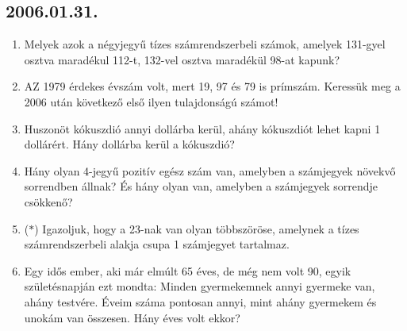 \subsection*{2006.01.31.}
\begin{enumerate}
\item Melyek azok a négyjegyű tízes számrendszerbeli számok, amelyek 131-gyel osztva maradékul 112-t, 132-vel osztva maradékül 98-at kapunk?

\item AZ 1979 érdekes évszám volt, mert 19, 97 és 79 is prímszám. Keressük meg a 2006 után következő első ilyen tulajdonságú számot!

\item Huszonöt kókuszdió annyi dollárba kerül, ahány kókuszdiót lehet kapni 1 dollárért. Hány dollárba kerül a kókuszdió?

\item Hány olyan 4-jegyű pozitív egész szám van, amelyben a számjegyek növekvő sorrendben állnak? És hány olyan van, amelyben a számjegyek sorrendje csökkenő?

\item ($*$) Igazoljuk, hogy a 23-nak van olyan többszöröse, amelynek a tízes számrendszerbeli alakja csupa 1 számjegyet tartalmaz.

\item Egy idős ember, aki már elmúlt 65 éves, de még nem volt 90, egyik születésnapján ezt mondta: Minden gyermekemnek annyi gyermeke van, ahány testvére. Éveim száma pontosan annyi, mint ahány gyermekem és unokám van összesen. Hány éves volt ekkor?

 
\end{enumerate}

